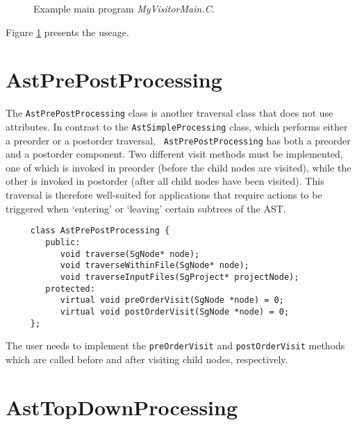 \begin{figure}
\begin{latexonly}
   
\end{latexonly}

\begin{htmlonly}
   
\end{htmlonly}
\caption{Example main program {\em MyVisitorMain.C}.}
\label{AstProcessing:myvisitor3}
\end{figure}

Figure \ref{AstProcessing:myvisitor3} presents the useage.

\section{AstPrePostProcessing}
\label{AstProcessing:AstPrePostProcessing}

The {\tt AstPrePostProcessing} class is another traversal class that does not
use attributes. In contrast to the {\tt AstSimpleProcessing} class, which
performs either a preorder or a postorder traversal, {\tt
AstPrePostProcessing} has both a preorder and a postorder component. Two
different visit methods must be implemented, one of which is invoked in
preorder (before the child nodes are visited), while the other is invoked in
postorder (after all child nodes have been visited). This traversal is
therefore well-suited for applications that require actions to be triggered
when `entering' or `leaving' certain subtrees of the AST.

{\indent
{\mySmallFontSize
\begin{verbatim}
     class AstPrePostProcessing {
        public:
           void traverse(SgNode* node);
           void traverseWithinFile(SgNode* node);
           void traverseInputFiles(SgProject* projectNode);
        protected:
           virtual void preOrderVisit(SgNode *node) = 0;
           virtual void postOrderVisit(SgNode *node) = 0;
     };
\end{verbatim}
}}

The user needs to implement the {\tt preOrderVisit} and {\tt postOrderVisit}
methods which are called before and after visiting child nodes, respectively.

\section{AstTopDownProcessing}
\label{AstProcessing:AstTopDownProcessing}

